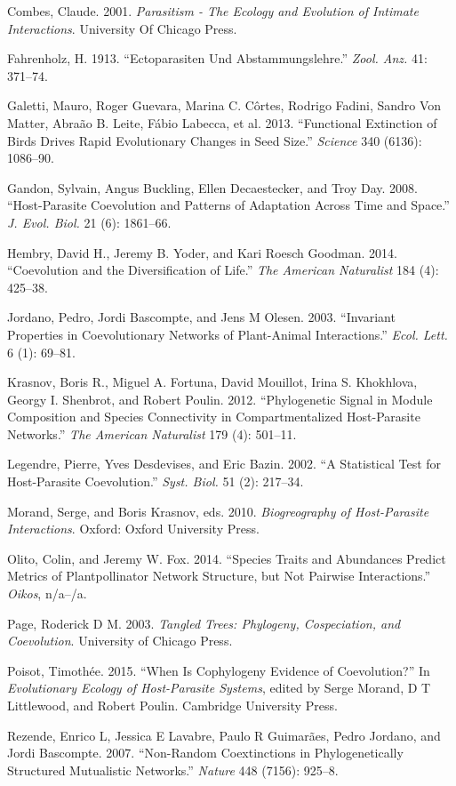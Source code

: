 \documentclass[12pt]{article}
\begin{document}
Combes, Claude. 2001. \emph{Parasitism - The Ecology and Evolution of
Intimate Interactions}. University Of Chicago Press.

Fahrenholz, H. 1913. ``Ectoparasiten Und Abstammungslehre.'' \emph{Zool.
Anz.} 41: 371--74.

Galetti, Mauro, Roger Guevara, Marina C. C{ô}rtes, Rodrigo Fadini,
Sandro Von Matter, Abra{ã}o B. Leite, F{á}bio Labecca, et al. 2013.
``Functional Extinction of Birds Drives Rapid Evolutionary Changes in
Seed Size.'' \emph{Science} 340 (6136): 1086--90.

Gandon, Sylvain, Angus Buckling, Ellen Decaestecker, and Troy Day. 2008.
``Host-Parasite Coevolution and Patterns of Adaptation Across Time and
Space.'' \emph{J. Evol. Biol.} 21 (6): 1861--66.

Hembry, David H., Jeremy B. Yoder, and Kari Roesch Goodman. 2014.
``Coevolution and the Diversification of Life.'' \emph{The American
Naturalist} 184 (4): 425--38.

Jordano, Pedro, Jordi Bascompte, and Jens M Olesen. 2003. ``Invariant
Properties in Coevolutionary Networks of Plant-Animal Interactions.''
\emph{Ecol. Lett.} 6 (1): 69--81.

Krasnov, Boris R., Miguel A. Fortuna, David Mouillot, Irina S.
Khokhlova, Georgy I. Shenbrot, and Robert Poulin. 2012. ``Phylogenetic
Signal in Module Composition and Species Connectivity in
Compartmentalized Host-Parasite Networks.'' \emph{The American
Naturalist} 179 (4): 501--11.

Legendre, Pierre, Yves Desdevises, and Eric Bazin. 2002. ``A Statistical
Test for Host-Parasite Coevolution.'' \emph{Syst. Biol.} 51 (2):
217--34.

Morand, Serge, and Boris Krasnov, eds. 2010. \emph{Biogreography of
Host-Parasite Interactions}. Oxford: Oxford University Press.

Olito, Colin, and Jeremy W. Fox. 2014. ``Species Traits and Abundances
Predict Metrics of Plantpollinator Network Structure, but Not Pairwise
Interactions.'' \emph{Oikos}, n/a--/a.

Page, Roderick D M. 2003. \emph{Tangled Trees: Phylogeny, Cospeciation,
and Coevolution}. University of Chicago Press.

Poisot, Timoth{é}e. 2015. ``When Is Cophylogeny Evidence of
Coevolution?'' In \emph{Evolutionary Ecology of Host-Parasite Systems},
edited by Serge Morand, D T Littlewood, and Robert Poulin. Cambridge
University Press.

Rezende, Enrico L, Jessica E Lavabre, Paulo R Guimar{ã}es, Pedro
Jordano, and Jordi Bascompte. 2007. ``Non-Random Coextinctions in
Phylogenetically Structured Mutualistic Networks.'' \emph{Nature} 448
(7156): 925--8.
\end{document}
